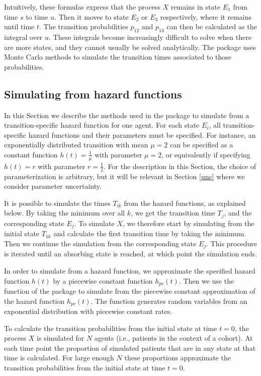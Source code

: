 Intuitively, these formulas express that the process $X$ remains in state $E_1$ from time $s$ to time $u$. Then it moves to state $E_2$ or $E_3$ respectively, where it remains until time $t$. The transition probabilities $p_{12}$ and $p_{13}$ can then be calculated as the integral over $u$. These integrals become increasingly difficult to solve when there are more states, and they cannot usually be solved analytically. The  package uses Monte Carlo methods to simulate the transition times associated to those probabilities.

\subsection[Simulation]{Simulating from hazard functions}\label{sim}
In this Section we describe the methods used in the package  to simulate from a transition-specific hazard function for one agent. For each state $E_i$, all transition-specific hazard functions and their parameters must be specified. For instance, an exponentially distributed transition with mean $\mu=2$ can be specified as a constant function $h(t)=\frac{1}{\mu}$ with parameter $\mu=2$, or equivalently if specifying $h(t)=r$ with parameter $r=\frac{1}{2}$. For the description in this Section, the choice of parameterization is arbitrary, but it will be relevant in Section \ref{unc} where we consider parameter uncertainty.

It is possible to simulate the times $T_{ik}$ from the hazard functions, as explained below. By taking the minimum over all $k$, we get the transition time $T_j$, and the corresponding state $E_j$. To simulate $X$, we therefore start by simulating from the initial state $T_{1k}$ and calculate the first transition time by taking the minimum. Then we continue the simulation from the corresponding state $E_j$. This procedure is iterated until an absorbing state is reached, at which point the simulation ends. 

In order to simulate from a hazard function, we approximate the specified hazard function $h(t)$ by a piecewise constant function $h_{pc}(t)$. Then we use the  function of the  package \citep{pkg:msm} to simulate from the piecewise constant approximation of the hazard function $h_{pc}(t)$. The  function generates random variables from an exponential distribution with piecewise constant rates.

To calculate the transition probabilities from the initial state at time $t=0$, the process $X$ is simulated for $N$ agents (i.e., patients in the context of a cohort). At each time point the proportion of simulated patients that are in any state at that time is calculated. For large enough $N$ these proportions approximate the transition probabilities from the initial state at time $t=0$. 

